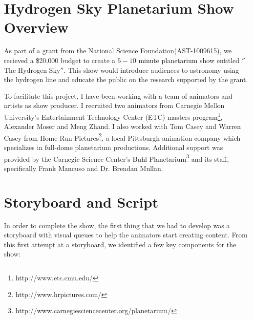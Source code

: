 \section{Hydrogen Sky Planetarium Show Overview}
As part of a grant from the National Science Foundation(AST-1009615), we recieved a \$20,000 budget to create a $5-10$ minute planetarium show entitled $''$The Hydrogen Sky$''$. This show would introduce audiences to astronomy using the \cm hydrogen line and educate the public on the research supported by the grant. 

To facilitate this project, I have been working with a team of animators and artists as show producer. I recruited two animators from Carnegie Mellon University's Entertainment Technology Center (ETC) masters program\footnote{http://www.etc.cmu.edu/}, Alexander Moser and Meng Zhand. I also worked with Tom Casey and Warren Casey from Home Run Pictures\footnote{http://www.hrpictures.com/}, a local Pittsburgh animation company which specializes in full-dome planetarium productions. Additional support was provided by the Carnegie Science Center's Buhl Planetarium\footnote{http://www.carnegiesciencecenter.org/planetarium/} and its staff, specifically Frank Mancuso and Dr. Brendan Mullan.

\section{Storyboard and Script}
In order to complete the show, the first thing that we had to develop was a storyboard with visual queues to help the animators start creating content. From this first attempt at a storyboard, we identified a few key components for the show:

